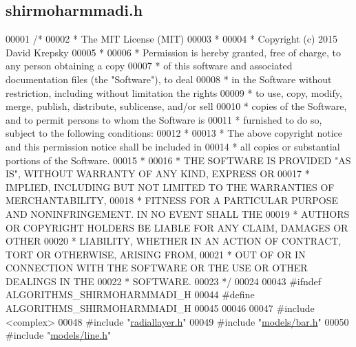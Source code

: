\hypertarget{shirmoharmmadi_8h_source}{}\subsection{shirmoharmmadi.\+h}
\label{shirmoharmmadi_8h_source}

\begin{DoxyCode}
00001 \textcolor{comment}{/*}
00002 \textcolor{comment}{ * The MIT License (MIT)}
00003 \textcolor{comment}{ *}
00004 \textcolor{comment}{ * Copyright (c) 2015 David Krepsky}
00005 \textcolor{comment}{ *}
00006 \textcolor{comment}{ * Permission is hereby granted, free of charge, to any person obtaining a copy}
00007 \textcolor{comment}{ * of this software and associated documentation files (the "Software"), to deal}
00008 \textcolor{comment}{ * in the Software without restriction, including without limitation the rights}
00009 \textcolor{comment}{ * to use, copy, modify, merge, publish, distribute, sublicense, and/or sell}
00010 \textcolor{comment}{ * copies of the Software, and to permit persons to whom the Software is}
00011 \textcolor{comment}{ * furnished to do so, subject to the following conditions:}
00012 \textcolor{comment}{ *}
00013 \textcolor{comment}{ * The above copyright notice and this permission notice shall be included in}
00014 \textcolor{comment}{ * all copies or substantial portions of the Software.}
00015 \textcolor{comment}{ *}
00016 \textcolor{comment}{ * THE SOFTWARE IS PROVIDED "AS IS", WITHOUT WARRANTY OF ANY KIND, EXPRESS OR}
00017 \textcolor{comment}{ * IMPLIED, INCLUDING BUT NOT LIMITED TO THE WARRANTIES OF MERCHANTABILITY,}
00018 \textcolor{comment}{ * FITNESS FOR A PARTICULAR PURPOSE AND NONINFRINGEMENT. IN NO EVENT SHALL THE}
00019 \textcolor{comment}{ * AUTHORS OR COPYRIGHT HOLDERS BE LIABLE FOR ANY CLAIM, DAMAGES OR OTHER}
00020 \textcolor{comment}{ * LIABILITY, WHETHER IN AN ACTION OF CONTRACT, TORT OR OTHERWISE, ARISING FROM,}
00021 \textcolor{comment}{ * OUT OF OR IN CONNECTION WITH THE SOFTWARE OR THE USE OR OTHER DEALINGS IN THE}
00022 \textcolor{comment}{ * SOFTWARE.}
00023 \textcolor{comment}{ */}
00024 
00043 \textcolor{preprocessor}{#ifndef ALGORITHMS\_SHIRMOHARMMADI\_H}
00044 \textcolor{preprocessor}{#define ALGORITHMS\_SHIRMOHARMMADI\_H}
00045 
00046 
00047 \textcolor{preprocessor}{#include <complex>}
00048 \textcolor{preprocessor}{#include "\hyperlink{radiallayer_8h}{radiallayer.h}"}
00049 \textcolor{preprocessor}{#include "\hyperlink{bar_8h}{models/bar.h}"}
00050 \textcolor{preprocessor}{#include "\hyperlink{line_8h}{models/line.h}"}

\end{DoxyCode}

